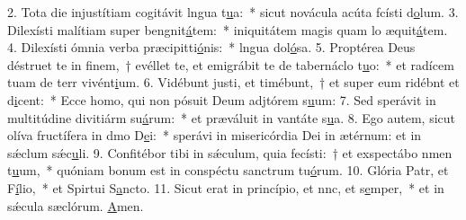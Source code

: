 2. Tota die injustítiam cogitávit lngua t\uline{u}a:~* sicut novácula acúta fcísti d\uline{o}lum.
3. Dilexísti malítiam super bengnit\uline{á}tem:~* iniquitátem magis quam lo æquit\uline{á}tem.
4. Dilexísti ómnia verba præcipitti\uline{ó}nis:~* lngua dol\uline{ó}sa.
5. Proptérea Deus déstruet te in finem,~† evéllet te, et emigrábit te de tabernáclo t\uline{u}o:~* et radícem tuam de terr vivént\uline{i}um.
6. Vidébunt justi, et timébunt,~† et super eum ridébnt et d\uline{i}cent:~* Ecce homo, qui non pósuit Deum adjtórem s\uline{u}um:
7. Sed sperávit in multitúdine divitiárm su\uline{á}rum:~* et præváluit in vantáte s\uline{u}a.
8. Ego autem, sicut olíva fructífera in dmo D\uline{e}i:~* sperávi in misericórdia Dei in ætérnum: et in sǽclum sǽc\uline{u}li.
9. Confitébor tibi in sǽculum, quia fecísti:~† et exspectábo nmen t\uline{u}um,~* quóniam bonum est in conspéctu sanctrum tu\uline{ó}rum.
10. Glória Patr, et F\uline{í}lio,~* et Spirtui S\uline{a}ncto.
11. Sicut erat in princípio, et nnc, et s\uline{e}mper,~* et in sǽcula sæclórum. \uline{A}men.
